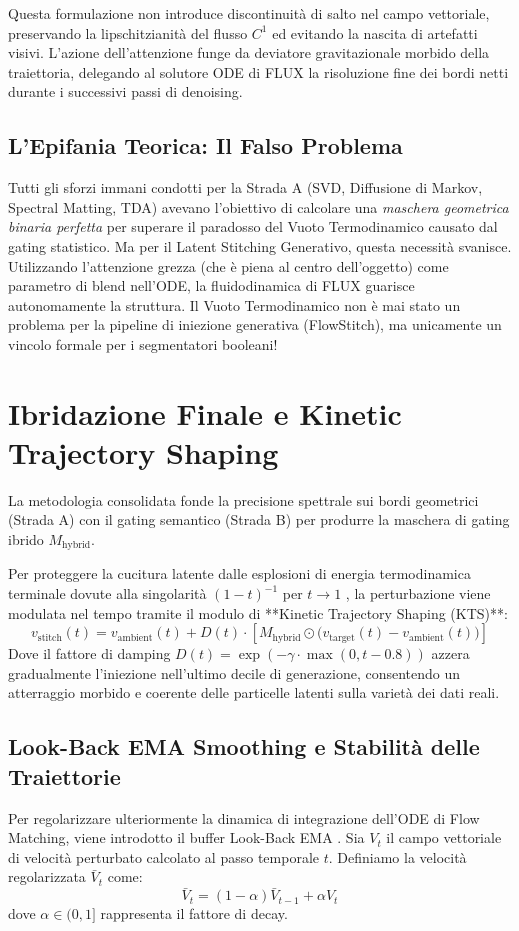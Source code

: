 \documentclass[12pt,a4paper]{report}
\begin{document}
Questa formulazione non introduce discontinuità di salto nel campo vettoriale, preservando la lipschitzianità del flusso $C^1$ ed evitando la nascita di artefatti visivi. L'azione dell'attenzione funge da deviatore gravitazionale morbido della traiettoria, delegando al solutore ODE di FLUX la risoluzione fine dei bordi netti durante i successivi passi di denoising.

\subsection{L'Epifania Teorica: Il Falso Problema}
Tutti gli sforzi immani condotti per la Strada A (SVD, Diffusione di Markov, Spectral Matting, TDA) avevano l'obiettivo di calcolare una \textit{maschera geometrica binaria perfetta} per superare il paradosso del Vuoto Termodinamico causato dal gating statistico.
Ma per il Latent Stitching Generativo, questa necessità svanisce. Utilizzando l'attenzione grezza (che è piena al centro dell'oggetto) come parametro di blend nell'ODE, la fluidodinamica di FLUX guarisce autonomamente la struttura. Il Vuoto Termodinamico non è mai stato un problema per la pipeline di iniezione generativa (FlowStitch), ma unicamente un vincolo formale per i segmentatori booleani!

\section{Ibridazione Finale e Kinetic Trajectory Shaping}
La metodologia consolidata fonde la precisione spettrale sui bordi geometrici (Strada A) con il gating semantico (Strada B) per produrre la maschera di gating ibrido $M_{\text{hybrid}}$. 

Per proteggere la cucitura latente dalle esplosioni di energia termodinamica terminale dovute alla singolarità $(1-t)^{-1}$ per $t \to 1$ \cite{kinetic2026}, la perturbazione viene modulata nel tempo tramite il modulo di **Kinetic Trajectory Shaping (KTS)**:
\begin{equation}
    v_{\text{stitch}}(t) = v_{\text{ambient}}(t) + D(t) \cdot \left[ M_{\text{hybrid}} \odot \Big( v_{\text{target}}(t) - v_{\text{ambient}}(t) \Big) \right]
\end{equation}
Dove il fattore di damping $D(t) = \exp(-\gamma \cdot \max(0, t - 0.8))$ azzera gradualmente l'iniezione nell'ultimo decile di generazione, consentendo un atterraggio morbido e coerente delle particelle latenti sulla varietà dei dati reali.

\subsection{Look-Back EMA Smoothing e Stabilità delle Traiettorie}
Per regolarizzare ulteriormente la dinamica di integrazione dell'ODE di Flow Matching, viene introdotto il buffer Look-Back EMA \cite{lookback2026}. Sia $V_t$ il campo vettoriale di velocità perturbato calcolato al passo temporale $t$. Definiamo la velocità regolarizzata $\bar{V}_t$ come:
\begin{equation}
    \bar{V}_t = (1 - \alpha)\bar{V}_{t-1} + \alpha V_t
\end{equation}
dove $\alpha \in (0, 1]$ rappresenta il fattore di decay. 
\end{document}
